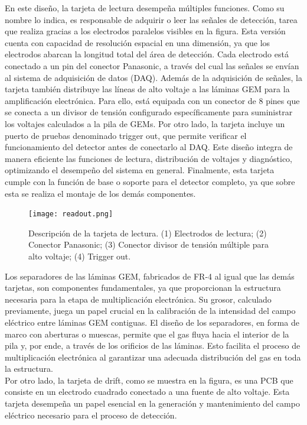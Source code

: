 \documentclass{article}
\begin{document}
\noindent En este diseño, la tarjeta de lectura desempeña múltiples funciones. Como su nombre lo indica, es responsable de adquirir o leer las señales de detección, tarea que realiza gracias a los electrodos paralelos visibles en la figura. Esta versión cuenta con capacidad de resolución espacial en una dimensión, ya que los electrodos abarcan la longitud total del área de detección. Cada electrodo está conectado a un pin del conector Panasonic, a través del cual las señales se envían al sistema de adquisición de datos (DAQ). Además de la adquisición de señales, la tarjeta también distribuye las líneas de alto voltaje a las láminas GEM para la amplificación electrónica. Para ello, está equipada con un conector de 8 pines que se conecta a un divisor de tensión configurado específicamente para suministrar los voltajes calculados a la pila de GEMs. Por otro lado, la tarjeta incluye un puerto de pruebas denominado trigger out, que permite verificar el funcionamiento del detector antes de conectarlo al DAQ. Este diseño integra de manera eficiente las funciones de lectura, distribución de voltajes y diagnóstico, optimizando el desempeño del sistema en general. Finalmente, esta tarjeta cumple con la función de base o soporte para el detector completo, ya que sobre esta se realiza el montaje de los demás componentes.

\begin{figure}[H]
    \centering
    \texttt{[image: readout.png]}
    \caption{Descripción de la tarjeta de lectura. (1) Electrodos de lectura; (2) Conector Panasonic; (3) Conector divisor de tensión múltiple para alto voltaje; (4) Trigger out.}
    \label{fig:readout_gem}
\end{figure}

\noindent Los separadores de las láminas GEM, fabricados de FR-4 al igual que las demás tarjetas, son componentes fundamentales, ya que proporcionan la estructura necesaria para la etapa de multiplicación electrónica. Su grosor, calculado previamente, juega un papel crucial en la calibración de la intensidad del campo eléctrico entre láminas GEM contiguas. El diseño de los separadores, en forma de marco con aberturas o muescas, permite que el gas fluya hacia el interior de la pila y, por ende, a través de los orificios de las láminas. Esto facilita el proceso de multiplicación electrónica al garantizar una adecuada distribución del gas en toda la estructura.\\ 

\noindent Por otro lado, la tarjeta de drift, como se muestra en la figura, es una PCB que consiste en un electrodo cuadrado conectado a una fuente de alto voltaje. Esta tarjeta desempeña un papel esencial en la generación y mantenimiento del campo eléctrico necesario para el proceso de detección.\\
\end{document}
